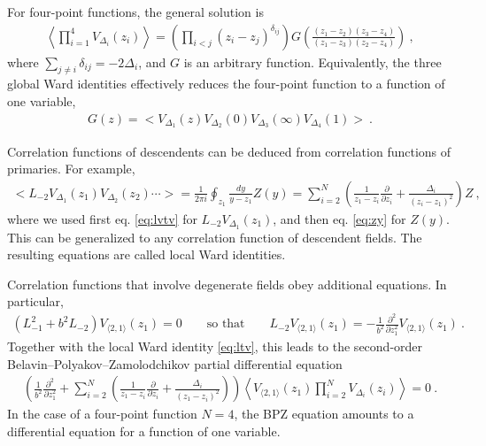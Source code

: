 \documentclass[12pt, a4paper]{article}
\theoremstyle{break}
\begin{document}
For four-point functions, the general solution is
\begin{align}
 \left< \prod_{i=1}^4 V_{\Delta_i}(z_i) \right> = \left(\prod_{i<j}(z_i-z_j)^{\delta_{ij}}\right) G\left(\frac{(z_1-z_2)(z_3-z_4)}{(z_1-z_3)(z_2-z_4)}\right)\ ,
\end{align}
where $\sum_{j\neq i} \delta_{ij} = -2\Delta_i$, and $G$ is an arbitrary function.
Equivalently, the three global Ward identities effectively reduces the four-point function to a function of one variable,
 \begin{align}
  G(z) = \Big< V_{\Delta_1}(z) V_{\Delta_2}(0)V_{\Delta_3}(\infty)V_{\Delta_4}(1) \Big>\ .
 \end{align}

Correlation functions of descendents can be deduced from correlation functions of primaries. For example,
\begin{align}
 \Big< L_{-2}V_{\Delta_1}(z_1) V_{\Delta_2}(z_2)\cdots \Big>
  = \frac{1}{2\pi i}\oint_{z_1} \frac{dy}{y-z_1} Z(y)
  =\sum_{i=2}^N\left(\frac{1}{z_1-z_i}\frac{\partial}{\partial z_i} +\frac{\Delta_i}{(z_i-z_1)^2}\right) Z\ ,
  \label{eq:ltv}
\end{align}
where we used first eq. \eqref{eq:lvtv} for $L_{-2}V_{\Delta_1}(z_1)$, and then eq. \eqref{eq:zy} for $Z(y)$.
This can be generalized to any correlation function of descendent fields. The resulting equations are called local Ward identities.

Correlation functions that involve degenerate fields obey additional equations. In particular, 
\begin{align}
\left(L_{-1}^2 + b^2 L_{-2}\right) V_{\langle 2, 1 \rangle}(z_1)  = 0\qquad \text{so that} \qquad L_{-2}V_{\langle 2, 1 \rangle}(z_1) = -\frac{1}{b^2}\frac{\partial^2}{\partial z_1^2} V_{\langle 2, 1 \rangle}(z_1)\ .
\end{align}
Together with the local Ward identity \eqref{eq:ltv},
this leads to the second-order Belavin--Polyakov--Zamolodchikov partial differential equation
\begin{align}
 \left( \frac{1}{b^2}\frac{\partial^2}{\partial z_1^2} + \sum_{i=2}^N\left(\frac{1}{z_1-z_i}\frac{\partial}{\partial z_i} +\frac{\Delta_i}{(z_1-z_i)^2}\right) \right)\left< V_{\langle 2, 1 \rangle}(z_1) \prod_{i=2}^N V_{\Delta_i}(z_i) \right>  = 0\ .
 \label{eq:bpz}
\end{align}
In the case of a four-point function $N=4$, the BPZ equation amounts to a differential equation for a function of one variable.
\end{document}
